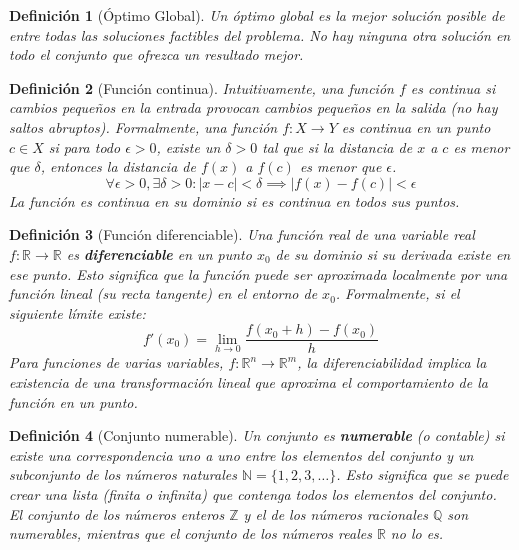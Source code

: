 \documentclass[12pt,a4paper]{book}
\newtheorem{defi}{Definición}[section]
\begin{document}
\begin{defi}[Óptimo Global]
\label{def:optimo_global}
Un óptimo global es la mejor solución posible de entre todas las soluciones factibles del problema.
No hay ninguna otra solución en todo el conjunto que ofrezca un resultado mejor.

\end{defi}


\begin{defi}[Función continua]
\label{def:fun_continua}
Intuitivamente, una función $f$ es continua si cambios pequeños en la entrada provocan cambios pequeños en la salida (no hay saltos abruptos). Formalmente, una función $f: X \to Y$ es continua en un punto $c \in X$ si para todo $\epsilon > 0$, existe un $\delta > 0$ tal que si la distancia de $x$ a $c$ es menor que $\delta$, entonces la distancia de $f(x)$ a $f(c)$ es menor que $\epsilon$.
$$ \forall \epsilon > 0, \exists \delta > 0 : |x-c| < \delta \implies |f(x)-f(c)| < \epsilon $$
La función es continua en su dominio si es continua en todos sus puntos.
\end{defi}

\begin{defi}[Función diferenciable]
    \label{def:fun_diferenciable}
Una función real de una variable real $f: \mathbb{R} \to \mathbb{R}$ es \textbf{diferenciable} en un punto $x_0$ de su dominio si su derivada existe en ese punto. Esto significa que la función puede ser aproximada localmente por una función lineal (su recta tangente) en el entorno de $x_0$. Formalmente, si el siguiente límite existe:
$$ f'(x_0) = \lim_{h \to 0} \frac{f(x_0+h) - f(x_0)}{h} $$
Para funciones de varias variables, $f: \mathbb{R}^n \to \mathbb{R}^m$, la diferenciabilidad implica la existencia de una transformación lineal  que aproxima el comportamiento de la función en un punto.
\end{defi}

\begin{defi}[Conjunto numerable]
\label{def:conjunto_numerable}
Un conjunto es \textbf{numerable} (o contable) si existe una correspondencia uno a uno entre los elementos del conjunto y un subconjunto de los números naturales $\mathbb{N} = \{1, 2, 3, \dots\}$. Esto significa que se puede crear una lista (finita o infinita) que contenga todos los elementos del conjunto. El conjunto de los números enteros $\mathbb{Z}$ y el de los números racionales $\mathbb{Q}$ son numerables, mientras que el conjunto de los números reales $\mathbb{R}$ no lo es.
\end{defi}
\end{document}
